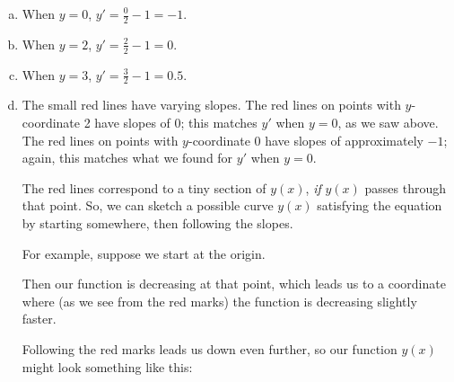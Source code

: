 \begin{solution}
\begin{enumerate}[(a)]
\item When $y=0$, $y'=\frac{0}{2}-1=-1$.
\item When $y=2$, $y'=\frac{2}{2}-1=0$.
\item When $y=3$, $y'=\frac{3}{2}-1=0.5$.
\item The small red lines have varying slopes. The red lines on points with $y$-coordinate 2 have slopes of  $0$; this matches $y'$ when $y=0$, as we saw above.
The red lines on points with $y$-coordinate 0 have slopes of approximately $-1$;
again, this matches what we found for $y'$ when $y=0$.

The red lines correspond to a tiny section of $y(x)$, \emph{if} $y(x)$ passes through that point. So, we can sketch a possible curve $y(x)$ satisfying the equation by starting somewhere, then following the slopes.

For example, suppose we start at the origin.
\begin{center}
\end{center}
Then our function is decreasing at that point, which leads us to a coordinate where (as we see from the red marks) the function is decreasing slightly faster.
\begin{center}
\end{center}
Following the red marks leads us down even further, so our function $y(x)$ might look something like this:
\begin{center}
\end{center}


\end{enumerate}
\end{solution}
